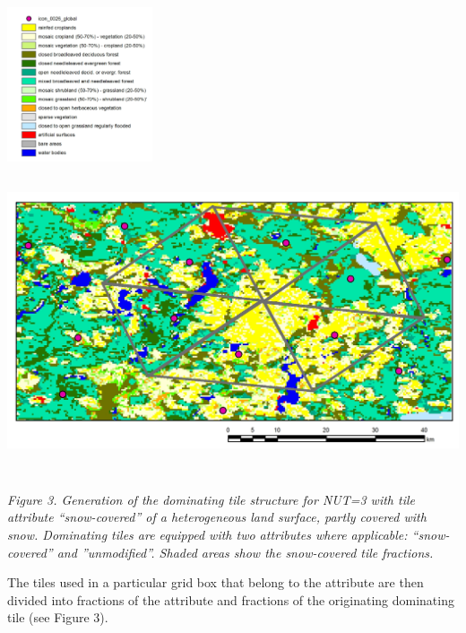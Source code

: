 \includegraphics[width=1.6875in,height=1.79583in]{../tex/extracted-media/media/image2.png}\includegraphics[width=6.77209in,height=3.58605in]{../tex/extracted-media/media/image4.png}

\emph{Figure 3. Generation of the dominating tile structure for NUT=3 with tile attribute ``snow-covered'' of a heterogeneous land surface, partly covered with snow. Dominating tiles are equipped with two attributes where applicable: ``snow-covered'' and ''unmodified''. Shaded areas show the snow-covered tile fractions.}

The tiles used in a particular grid box that belong to the attribute are then divided into fractions of the attribute and fractions of the originating dominating tile (see Figure 3).
